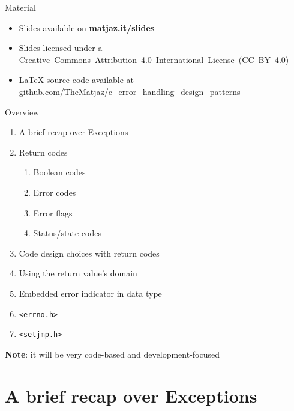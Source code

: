 \documentclass[aspectratio=169,14pt]{beamer}
\begin{document}
\begin{frame}
\titlepage
\end{frame}



\begin{frame}[label=material]{Material}
\begin{itemize}
    \item Slides available on \href{https://matjaz.it/slides/}{\textbf{matjaz.it/slides}} 
    \item Slides licensed under a 
    \href{https://creativecommons.org/licenses/by/4.0/}{Creative~Commons~Attribution~4.0~International~License~(CC~BY~4.0)}
    \item LaTeX source code available at
    \href{https://github.com/TheMatjaz/c_error_handling_design_patterns}{github.com/TheMatjaz/c\_error\_handling\_design\_patterns}
\end{itemize}
\end{frame}



\begin{frame}{Overview}
\begin{enumerate}
    \item A brief recap over Exceptions
    \item Return codes\\
    \begin{enumerate}
        \item Boolean codes
        \item Error codes
        \item Error flags
        \item Status/state codes
    \end{enumerate}
    \item Code design choices with return codes
    \item Using the return value's domain
    \item Embedded error indicator in data type
    \item \texttt{<errno.h>}
    \item \texttt{<setjmp.h>}
\end{enumerate}

\textbf{Note}: it will be very code-based and development-focused
\end{frame}





\section{A brief recap over Exceptions}
\end{document}
